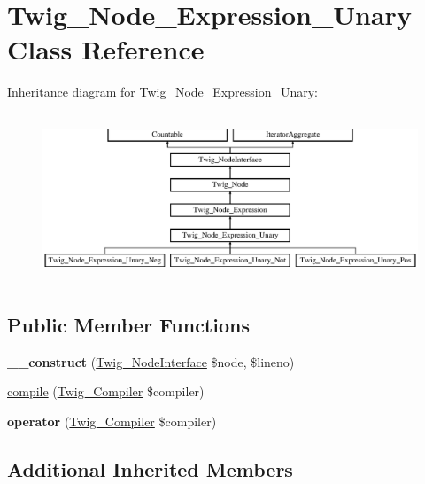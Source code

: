 \hypertarget{class_twig___node___expression___unary}{}\section{Twig\+\_\+\+Node\+\_\+\+Expression\+\_\+\+Unary Class Reference}
\label{class_twig___node___expression___unary}
Inheritance diagram for Twig\+\_\+\+Node\+\_\+\+Expression\+\_\+\+Unary\+:\begin{figure}[H]
\begin{center}
\leavevmode
\includegraphics[height=5.022421cm]{class_twig___node___expression___unary}
\end{center}
\end{figure}
\subsection*{Public Member Functions}
\begin{DoxyCompactItemize}
\item 
\hypertarget{class_twig___node___expression___unary_a830fcaf963f7198fdebdcad4907c42ab}{}{\bfseries \+\_\+\+\_\+construct} (\hyperlink{interface_twig___node_interface}{Twig\+\_\+\+Node\+Interface} \$node, \$lineno)\label{class_twig___node___expression___unary_a830fcaf963f7198fdebdcad4907c42ab}

\item 
\hyperlink{class_twig___node___expression___unary_a4e0faa87c3fae583620b84d3607085da}{compile} (\hyperlink{class_twig___compiler}{Twig\+\_\+\+Compiler} \$compiler)
\item 
\hypertarget{class_twig___node___expression___unary_af77318ec88d5f8a508684970a150b670}{}{\bfseries operator} (\hyperlink{class_twig___compiler}{Twig\+\_\+\+Compiler} \$compiler)\label{class_twig___node___expression___unary_af77318ec88d5f8a508684970a150b670}

\end{DoxyCompactItemize}
\subsection*{Additional Inherited Members}


